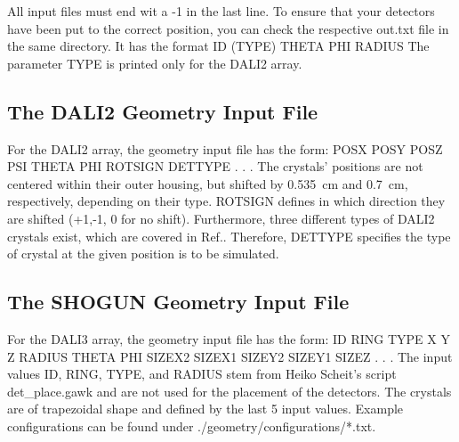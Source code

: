 \documentclass[12pt]{book}
\begin{document}
All input files must end wit a -1 in the last line.
To ensure that your detectors have been put to the correct position, you can check the respective 
{\ttfamily *out.txt} file in the same directory. It has the format 
\linebreak
\linebreak
{\ttfamily ID (TYPE) THETA PHI RADIUS }\linebreak
\linebreak
\linebreak
The parameter {\ttfamily TYPE} is printed only for the DALI2 array.

\subsection{The DALI2 Geometry Input File}

For the DALI2 array, the geometry input file has the form:\hfill{} 
\linebreak
\linebreak
{\ttfamily POSX POSY POSZ PSI THETA PHI ROTSIGN DETTYPE}\linebreak
{\ttfamily .}\linebreak
{\ttfamily .}\linebreak
{\ttfamily .}\linebreak
\linebreak
\linebreak
The crystals' positions are not centered within their outer housing, but shifted by 0.535~cm and 0.7~cm, respectively,
depending on their type. 
{\ttfamily ROTSIGN} defines in which direction they are shifted (+1,-1, 0 for no shift). Furthermore, three different
types of DALI2 crystals exist, which are covered in Ref.\cite{takeuchi:2014:nima}. Therefore, {\ttfamily DETTYPE} specifies
the type of crystal at the given position is to be simulated.

\subsection{The SHOGUN Geometry Input File}

For the DALI3 array, the geometry input file has the form:\hfill{} 
\linebreak
\linebreak
{\ttfamily ID RING TYPE X Y Z RADIUS THETA PHI SIZEX2 SIZEX1 SIZEY2 SIZEY1 SIZEZ}\linebreak
{\ttfamily .}\linebreak
{\ttfamily .}\linebreak
{\ttfamily .}\linebreak
\linebreak
\linebreak
The input values {\ttfamily ID, RING, TYPE,} and {\ttfamily RADIUS} stem from Heiko Scheit's 
script {\ttfamily det\_place.gawk} and are not used for the placement of the detectors. The crystals are of trapezoidal 
shape and defined by the last 5 input values. Example configurations can be found under  
{\ttfamily ./geometry/configurations/*.txt}.
\end{document}
